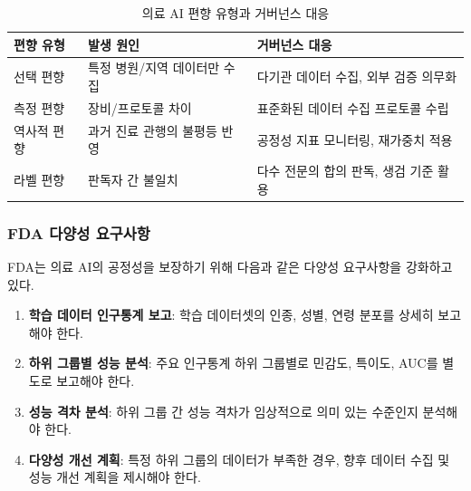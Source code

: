 \begin{table}[htbp]
\centering
\caption{의료 AI 편향 유형과 거버넌스 대응}
\label{tab:16_bias}
\begin{tabularx}{\textwidth}{p{2.5cm}Xp{5cm}}
\toprule
\textbf{편향 유형} & \textbf{발생 원인} & \textbf{거버넌스 대응} \\
\midrule
선택 편향 & 특정 병원/지역 데이터만 수집 & 다기관 데이터 수집, 외부 검증 의무화 \\
측정 편향 & 장비/프로토콜 차이 & 표준화된 데이터 수집 프로토콜 수립 \\
역사적 편향 & 과거 진료 관행의 불평등 반영 & 공정성 지표 모니터링, 재가중치 적용 \\
라벨 편향 & 판독자 간 불일치 & 다수 전문의 합의 판독, 생검 기준 활용 \\
\bottomrule
\end{tabularx}
\end{table}

\subsubsection{FDA 다양성 요구사항}

FDA는 의료 AI의 공정성을 보장하기 위해 다음과 같은 다양성 요구사항을 강화하고 있다.

\begin{enumerate}
 \item \textbf{학습 데이터 인구통계 보고}: 학습 데이터셋의 인종, 성별, 연령 분포를 상세히 보고해야 한다.
 \item \textbf{하위 그룹별 성능 분석}: 주요 인구통계 하위 그룹별로 민감도, 특이도, AUC를 별도로 보고해야 한다.
 \item \textbf{성능 격차 분석}: 하위 그룹 간 성능 격차가 임상적으로 의미 있는 수준인지 분석해야 한다.
 \item \textbf{다양성 개선 계획}: 특정 하위 그룹의 데이터가 부족한 경우, 향후 데이터 수집 및 성능 개선 계획을 제시해야 한다.
\end{enumerate}

